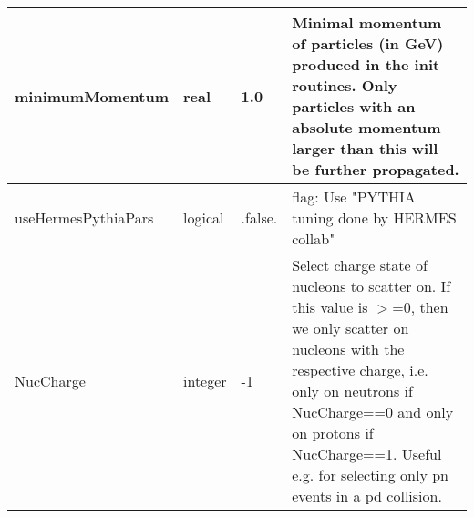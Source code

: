 \documentclass{article}
\begin{document}
\begin{longtable}{llll}
\midrule
minimumMomentum & \begin{minipage}[t]{2cm}real\end{minipage} & \begin{minipage}[t]{2cm}1.0\end{minipage} & \begin{minipage}[t]{12cm}Minimal momentum of particles (in GeV) produced in the init routines. Only particles with an absolute momentum larger than this will be further propagated.\end{minipage}\\*
\midrule
useHermesPythiaPars & \begin{minipage}[t]{2cm}logical\end{minipage} & \begin{minipage}[t]{2cm}.false.\end{minipage} & \begin{minipage}[t]{12cm}flag: Use "PYTHIA tuning done by HERMES collab"\end{minipage}\\*
\midrule
NucCharge & \begin{minipage}[t]{2cm}integer\end{minipage} & \begin{minipage}[t]{2cm}-1\end{minipage} & \begin{minipage}[t]{12cm}Select charge state of nucleons to scatter on. If this value is $>$=0, then we only scatter on nucleons with the respective charge, i.e. only on neutrons if NucCharge==0 and only on protons if NucCharge==1. Useful e.g. for selecting only pn events in a pd collision.\end{minipage}\\*
\bottomrule
\end{longtable}
{ }



\end{document}

